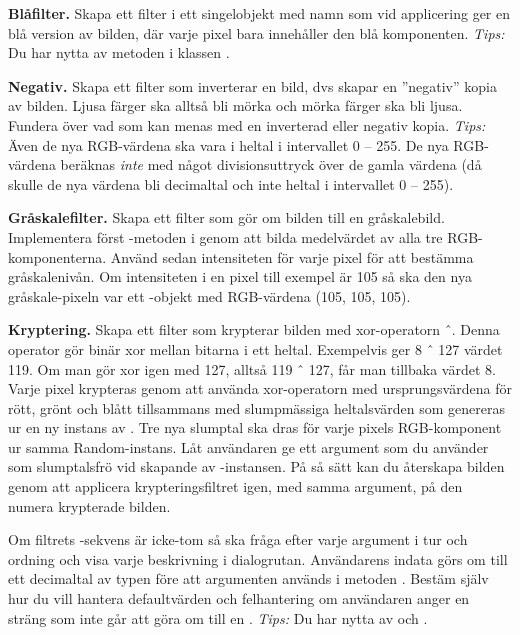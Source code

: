 \Task \textbf{Blåfilter.} Skapa ett filter i ett singelobjekt med namn  som vid applicering ger en blå version av bilden, där varje pixel bara innehåller den blå komponenten. \emph{Tips:} Du har nytta av metoden  i klassen . 

\Task \textbf{Negativ.} Skapa ett filter  som inverterar en bild, dvs skapar en ''negativ'' kopia av bilden. Ljusa färger ska alltså bli mörka och mörka färger ska bli ljusa.
Fundera över vad som kan menas med en inverterad eller negativ kopia. \emph{Tips:} Även de nya RGB-värdena ska vara i heltal i intervallet 0 -- 255. De nya RGB-värdena beräknas \emph{inte} med något divisionsuttryck över de gamla värdena (då skulle de nya värdena bli decimaltal och inte heltal i intervallet 0 -- 255). 

\Task \textbf{Gråskalefilter.} Skapa ett filter  som gör om bilden till en gråskalebild. Implementera först -metoden i  genom att bilda medelvärdet av alla tre RGB-komponenterna. Använd sedan intensiteten för varje pixel för att bestämma gråskalenivån. Om intensiteten i en pixel till exempel är 105 så ska den nya gråskale-pixeln var ett -objekt med RGB-värdena (105, 105, 105).

\Task \textbf{Kryptering.} Skapa ett filter  som krypterar bilden med xor-operatorn ˆ. Denna operator gör binär xor mellan bitarna i ett heltal. Exempelvis ger 8 ˆ 127 värdet 119. Om man gör xor igen med 127, alltså 119 ˆ 127, får man tillbaka värdet 8. Varje pixel krypteras genom att använda xor-operatorn med ursprungsvärdena för rött, grönt och blått tillsammans med slumpmässiga heltalsvärden som genereras ur en ny instans av . Tre nya slumptal ska dras för varje pixels RGB-komponent ur samma Random-instans. Låt användaren ge ett argument som du använder som slumptalsfrö vid skapande av -instansen. På så sätt kan du återskapa bilden genom att applicera krypteringsfiltret igen, med samma argument, på den numera krypterade bilden.

Om filtrets -sekvens är icke-tom så ska  fråga efter varje argument i tur och ordning och visa varje beskrivning i dialogrutan. Användarens indata görs om till ett decimaltal av typen  före att argumenten används i metoden . Bestäm själv hur du vill hantera defaultvärden och felhantering om användaren anger en sträng som inte går att göra om till en . \emph{Tips:} Du har nytta av  och .

